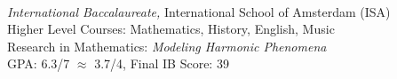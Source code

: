  \\[0.2cm]
{\sl International Baccalaureate,}
International School of Amsterdam (ISA)\\
Higher Level Courses: Mathematics, History, English, Music \\
Research in Mathematics: \textit{Modeling Harmonic Phenomena} \\
GPA: 6.3/7 $\approx$ 3.7/4, Final IB Score: 39
